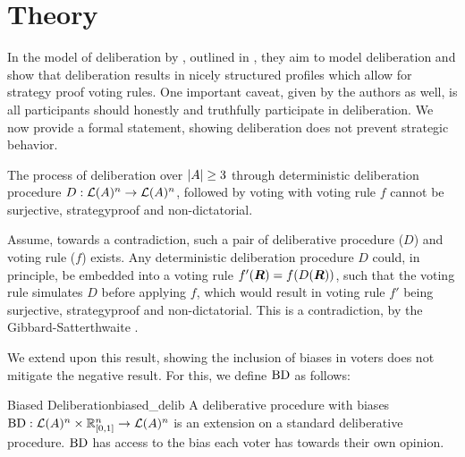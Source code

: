 \newpage \chapter{Theory} \label{theory}


In the model of deliberation by
\citet{radDeliberationSinglePeakednessCoherent2021}, outlined in
, they aim to model deliberation and show that
deliberation results in nicely structured profiles which allow for strategy
proof voting rules. One important caveat, given by the authors as well, is all
participants should honestly and truthfully participate in deliberation. We now
provide a formal statement, showing deliberation does not prevent strategic
behavior.

\begin{proposition} The process of deliberation over $|A| \geq 3$
	through deterministic deliberation procedure \({D}:
	\mathcal{L}(A)^n \to \mathcal{L}(A)^n\), followed by voting
	with voting rule $f$ cannot be surjective, strategyproof and
	non-dictatorial.

	\label{proposition:deterministic-delib} \end{proposition}

\begin{proofc} Assume, towards a contradiction, such a pair of deliberative
	procedure ($D$) and voting rule (\(f\)) exists. Any deterministic deliberation
	procedure $D$ could, in principle, be embedded into a voting rule
	$f'(\boldsymbol{R}) = f(D(\boldsymbol{R}))$, such that the voting rule
	simulates $D$ before applying $f$, which would result in  voting rule $f'$
	being surjective, strategyproof and non-dictatorial. This is a contradiction,
	by the Gibbard-Satterthwaite
	.
\end{proofc}


We extend upon this result, showing the inclusion of biases in voters does not
mitigate the negative result. For this, we define $\operatorname{BD}$ as
follows:

\begin{definition}{Biased Deliberation}{biased_delib} A deliberative procedure
	with biases $\operatorname{BD} : \mathcal{L}(A) ^ n \times
		\mathbb{R}_{[0,1]}^n \to \mathcal{L}(A)^n$ is an extension on a
	standard deliberative procedure. \(\operatorname{BD}\) has access to
	the bias each voter has towards their own opinion. \end{definition}

